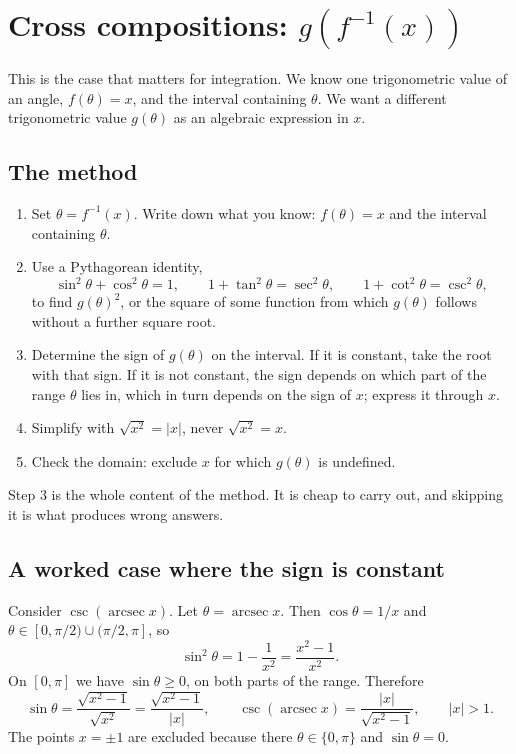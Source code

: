 \documentclass{essay}
\DeclareMathOperator{\arcsec}{arcsec}
\begin{document}
\section{Cross compositions: $g(f^{-1}(x))$}\label{sec:cross}

This is the case that matters for integration. We know one trigonometric
value of an angle, $f(\theta) = x$, and the interval containing $\theta$.
We want a different trigonometric value $g(\theta)$ as an algebraic
expression in $x$.

\subsection{The method}

\begin{enumerate}
  \item Set $\theta = f^{-1}(x)$. Write down what you know: $f(\theta) = x$
        and the interval containing $\theta$.
  \item Use a Pythagorean identity,
        \[
        \sin^2\theta + \cos^2\theta = 1, \qquad
        1 + \tan^2\theta = \sec^2\theta, \qquad
        1 + \cot^2\theta = \csc^2\theta,
        \]
        to find $g(\theta)^2$, or the square of some function from which
        $g(\theta)$ follows without a further square root.
  \item Determine the sign of $g(\theta)$ on the interval. If it is
        constant, take the root with that sign. If it is not constant,
        the sign depends on which part of the range $\theta$ lies in,
        which in turn depends on the sign of $x$; express it through $x$.
  \item Simplify with $\sqrt{x^2} = |x|$, never $\sqrt{x^2} = x$.
  \item Check the domain: exclude $x$ for which $g(\theta)$ is undefined.
\end{enumerate}

Step 3 is the whole content of the method. It is cheap to carry out, and
skipping it is what produces wrong answers.

\subsection{A worked case where the sign is constant}

\begin{example}
Consider $\csc(\arcsec x)$. Let $\theta = \arcsec x$. Then
$\cos\theta = 1/x$ and $\theta \in [0, \pi/2) \cup (\pi/2, \pi]$, so
\[
\sin^2\theta = 1 - \frac{1}{x^2} = \frac{x^2 - 1}{x^2}.
\]
On $[0, \pi]$ we have $\sin\theta \ge 0$, on both parts of the range.
Therefore
\[
\sin\theta = \frac{\sqrt{x^2 - 1}}{\sqrt{x^2}}
           = \frac{\sqrt{x^2 - 1}}{|x|},
\qquad
\csc(\arcsec x) = \frac{|x|}{\sqrt{x^2 - 1}},
\qquad |x| > 1.
\]
The points $x = \pm 1$ are excluded because there $\theta \in \{0, \pi\}$
and $\sin\theta = 0$.
\end{example}
\end{document}
